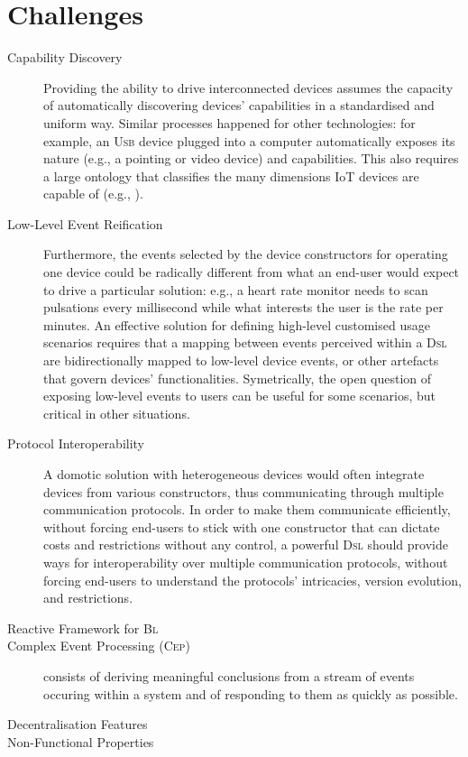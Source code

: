 \section{Challenges}
\label{sec:Challenges}

\begin{description}
	\item[Capability Discovery] Providing the ability to drive interconnected devices assumes the capacity of automatically discovering devices' capabilities in a standardised and uniform way. Similar processes happened for other technologies: for example, an \textsc{Usb} device plugged into a computer automatically exposes its nature (e.g., a pointing or video device) and capabilities. This also requires a large ontology that classifies the many dimensions IoT devices are capable of (e.g., \cite{}).
	
	\item[Low-Level Event Reification] Furthermore, the events selected by the device constructors for operating one device could be radically different from what an end-user would expect to drive a particular solution: e.g., a heart rate monitor needs to scan pulsations every millisecond while what interests the user is the rate per minutes. An effective solution for defining high-level customised usage scenarios requires that a mapping between events perceived within a \textsc{Dsl} are bidirectionally mapped to low-level device events, or other artefacts that govern devices' functionalities. Symetrically, the open question of exposing low-level events to users can be useful for some scenarios, but critical in other situations. 
	
	\item[Protocol Interoperability] A domotic solution with heterogeneous devices would often integrate devices from various constructors, thus communicating through multiple communication protocols. In order to make them communicate efficiently, without forcing end-users to stick with one constructor that can dictate costs and restrictions without any control, a powerful \textsc{Dsl} should provide ways for interoperability over multiple communication protocols, without forcing end-users to understand the protocols' intricacies, version evolution, and restrictions.
	
	\item[Reactive Framework for \textsc{Bl}] 
	
	\item[Complex Event Processing (\textsc{Cep})] consists of deriving meaningful conclusions from a stream of events occuring within a system and of responding to them as quickly as possible. 
	
	\item[Decentralisation Features] 
	
	\item[Non-Functional Properties] 
\end{description}
